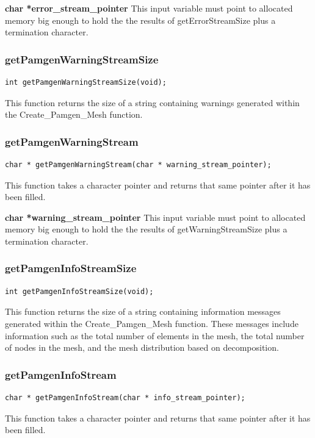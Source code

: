 {\setlength{\parindent}{0pt}
 \textbf{char *error\_stream\_pointer} This input variable must point to allocated memory big enough to hold the the results of getErrorStreamSize plus a termination character.
}


\subsubsection{getPamgenWarningStreamSize}
{\ttfamily  \begin{verbatim}
int getPamgenWarningStreamSize(void);
\end{verbatim}}
This function returns the size of a string containing warnings generated within the Create\_Pamgen\_Mesh function.

\subsubsection{getPamgenWarningStream}
{\ttfamily  \begin{verbatim}
char * getPamgenWarningStream(char * warning_stream_pointer);
\end{verbatim}}
This function takes a character pointer and returns that same pointer after it has been filled.

{\setlength{\parindent}{0pt}
 \textbf{char *warning\_stream\_pointer} This input variable must point to allocated memory big enough to hold the the results of getWarningStreamSize plus a termination character.
}

\subsubsection{getPamgenInfoStreamSize}
{\ttfamily  \begin{verbatim}
int getPamgenInfoStreamSize(void);
\end{verbatim}}
This function returns the size of a string containing information messages generated within the Create\_Pamgen\_Mesh function. These messages include information such as the total number of elements in the mesh, the total number of nodes in the mesh, and the mesh distribution based on decomposition.

\subsubsection{getPamgenInfoStream}
{\ttfamily  \begin{verbatim}
char * getPamgenInfoStream(char * info_stream_pointer);
\end{verbatim}}
This function takes a character pointer and returns that same pointer after it has been filled.

